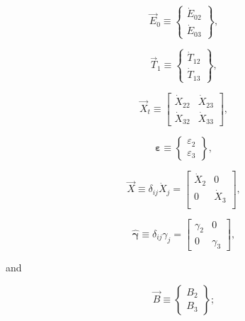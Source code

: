 \begin{equation} \label{eq:E_vec_def}
	\vec{E}_{0} 
	\equiv
	\begin{Bmatrix}
		\dot{E}_{02} \\
		\dot{E}_{03}
	\end{Bmatrix},
\end{equation}

\begin{equation} \label{eq:T_vec_def}
	\vec{T}_{1} 
	\equiv
	\begin{Bmatrix}
		\dot{T}_{12} \\
		\dot{T}_{13}
	\end{Bmatrix},
\end{equation}

\begin{equation} \label{eq:X_t_matrix_def}
	\vec{X}_{t} 
	\equiv
	\begin{bmatrix}
		\dot{X}_{22} & \dot{X}_{23} \\
		\dot{X}_{32} & \dot{X}_{33}
	\end{bmatrix},
\end{equation}

\begin{equation} \label{eq:eps_vec_def}
	\bm{\varepsilon} 
	\equiv
	\begin{Bmatrix}
		\varepsilon_{2}	\\
		\varepsilon_{3}
	\end{Bmatrix},
\end{equation}

\begin{equation} \label{eq:X_hat_matrix_def}
	\hat{\vec{X}} 
	\equiv
	\delta_{ij} \dot{X}_{j} 
	= 
	\begin{bmatrix}
		\dot{X}_{2}		&	0	  \\
		0				&	\dot{X}_{3}	\\
	\end{bmatrix},
\end{equation}

\begin{equation}
	\hat{\bm{\gamma}}
	\equiv
	\delta_{ij} \gamma_{j}
	=
	\begin{bmatrix}
		\gamma_{2} & 0         \\
		0          & \gamma_{3}
	\end{bmatrix},
\end{equation}

\noindent{}and

\begin{equation} \label{eq:B_vec_def}
	\vec{B} 
	\equiv
	\begin{Bmatrix}	
		B_{2} \\
		B_{3}
	\end{Bmatrix};
\end{equation}


